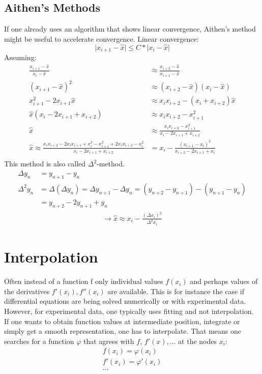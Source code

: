 \section{Aithen's Methods}\label{sec:aithen's-methods}
If one already uses an algorithm that shows linear convergence, Aithen's method might be useful to
accelerate convergence.
Linear convergence:
\begin{equation*}
    \lvert x_{i+1} - \hat{x} \rvert \leq C * \lvert x_i - \hat{x} \rvert
\end{equation*}
Assuming:
\begin{align*}
    \frac{ x_{i+1}-\hat{x} }{x_i - \hat{x}} &\approx
    \frac{ x_{i+2}-\hat{x}}{x_{i+1}-\hat{x}}\\
    (x_{i+1}-\hat{x})^2 &\approx (x_{i+2}-\hat{x})(x_i-\hat{x})\\
    x_{i+1}^2-2x_{i+1}\hat{x} &\approx x_i x_{i+2}-(x_i+x_{i+2})\hat{x}\\
    \hat{x}(x_i-2x_{i+1}+x_{i+2}) &\approx x_i x_{i+2}- x_{i+1}^2\\
    \hat{x} &\approx \frac{x_i x_{i+2}-x_{i+1}^2}{x_i-2x_{i+1}+ x_{i+2}}\\
    \hat{x}\approx\frac{x_i x_{i+2}-2x_i x_{i+1}+x_i^2-x_{i+1}^2+2x_i x_{i+2}-x_i^2}{x_i-2x_{i+1}+x_{i+2}}&= x_i-\frac{(x_{i+1}-x_i)^2}{x_{i+2}-2x_{i+1}+x_i}\\
\end{align*}
This method is also called $\Delta^2$-method.
\begin{align*}
    \Delta y_n &= y_{n+1}-y_n\\
    \Delta^2 y_n &= \Delta(\Delta y_n) = \Delta y_{n+1}-\Delta y_n = (y_{n+2}-y_{n+1})-(y_{n+1}-y_n)\\
    &=y_{n+2} -2y_{n+1}+y_n
\end{align*}
\begin{align*}
    \to \hat{x}\approx x_i - \frac{(\Delta x_i)^2}{\Delta^2 x_i}
\end{align*}


\chapter{Interpolation}\label{ch:interpolation}
Often instead of a function f only individual values $f(x_i)$ and
perhaps values of the derivatives $f'(x_i), f''(x_i)$ are available.
This is for instance the case if differential equations are being solved
numerically or with experimental data.
However, for experimental data, one typically uses fitting and not interpolation.
If one wants to obtain function values at intermediate position, integrate or
simply get a smooth representation, one has to interpolate.
That means one searches for a function $\varphi$ that agrees with $f$, $f'(x), \ldots$
at the nodes $x_i$:
\begin{align*}
    f(x_i)=\varphi(x_i)\\
    f'(x_i)=\varphi'(x_i)\\
    \ldots
\end{align*}


